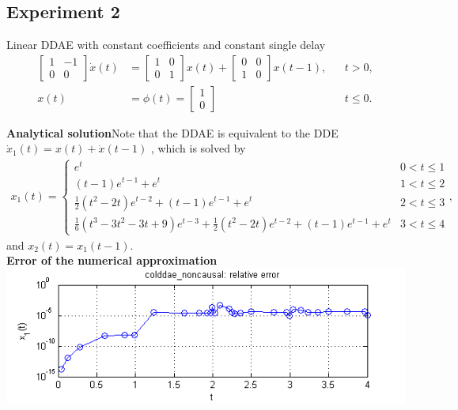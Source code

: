 \documentclass[final,reqno]{siamltex}
\begin{document}
\subsection{Experiment 2}Linear DDAE with constant coefficients and constant single delay
\begin{equation}
\begin{aligned}
\begin{bmatrix}
1&-1\\
0&0 
\end{bmatrix}
\dot{x}(t) &=
\begin{bmatrix}
1& 0\\
0&1 
\end{bmatrix}
 x(t) + 
\begin{bmatrix}
0& 0\\
1&0
\end{bmatrix}
 x(t-1),&&t>0,\\
x(t) &= \phi(t)=
\begin{bmatrix}
1\\
0 
\end{bmatrix}
&&t \leq 0.
\end{aligned}
\end{equation}

{\bf Analytical solution}\quad Note that the DDAE is equivalent to the DDE $\dot{x}_1(t)=x(t)+\dot{x}(t-1)$ , which is solved by
\begin{align*}
x_1(t)=\left\{
\begin{array}{ll}
e^t & 0<t\leq1\\
(t-1)e^{t-1}+e^t & 1<t\leq2\\
\tfrac12(t^2-2t)e^{t-2}+(t-1)e^{t-1}+e^t & 2<t\leq3\\
\tfrac16(t^3-3t^2-3t+9)e^{t-3}+\tfrac12 (t^2-2t)e^{t-2}+(t-1)e^{t-1}+e^t& 3<t\leq4
\end{array}
\right.,
\end{align*}
and
$x_2(t)=x_1(t-1)$.\\

{\bf Error of the numerical approximation}\\
\includegraphics[width=\textwidth]{plot_dde214}
\end{document}
